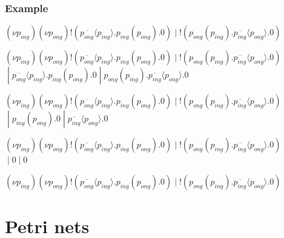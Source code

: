 \documentclass{beamer}
\begin{document}
\begin{frame}
\frametitle{Example}

$
(\nu p_{ing})(\nu p_{ong}) !( \overline{p_{ong}}\langle p_{ing} \rangle. p_{ing}(p_{ong}). 0 )
                     \;|\; !( p_{ong}(p_{ing}). \overline{p_{ing}}\langle p_{ong} \rangle. 0 )
$ \pause \\

\vspace{15pt}

$
(\nu p_{ing})(\nu p_{ong}) !( \overline{p_{ong}}\langle p_{ing} \rangle. p_{ing}(p_{ong}). 0 )
                     \;|\; !( p_{ong}(p_{ing}). \overline{p_{ing}}\langle p_{ong} \rangle. 0 ) $ \\
\hspace{1cm} $       \;|\; \overline{p_{ong}}\langle p_{ing} \rangle. p_{ing}(p_{ong}). 0
                     \;|\; p_{ong}(p_{ing}). \overline{p_{ing}}\langle p_{ong} \rangle. 0 $
\pause \\

\vspace{15pt}

$
(\nu p_{ing})(\nu p_{ong}) !( \overline{p_{ong}}\langle p_{ing} \rangle. p_{ing}(p_{ong}). 0 )
                     \;|\; !( p_{ong}(p_{ing}). \overline{p_{ing}}\langle p_{ong} \rangle. 0 ) $ \\
\hspace{1cm} $       \;|\; p_{ing}(p_{ong}). 0
                     \;|\; \overline{p_{ing}}\langle p_{ong} \rangle. 0 $
\pause \\

\vspace{15pt}

$
(\nu p_{ing})(\nu p_{ong}) !( \overline{p_{ong}}\langle p_{ing} \rangle. p_{ing}(p_{ong}). 0 )
                     \;|\; !( p_{ong}(p_{ing}). \overline{p_{ing}}\langle p_{ong} \rangle. 0 ) $ \\
\hspace{1cm} $       \;|\; 0
                     \;|\; 0 $
\pause \\

\vspace{15pt}

$
(\nu p_{ing})(\nu p_{ong}) !( \overline{p_{ong}}\langle p_{ing} \rangle. p_{ing}(p_{ong}). 0 )
                     \;|\; !( p_{ong}(p_{ing}). \overline{p_{ing}}\langle p_{ong} \rangle. 0 )
$

\end{frame}

\section{Petri nets}
\end{document}
